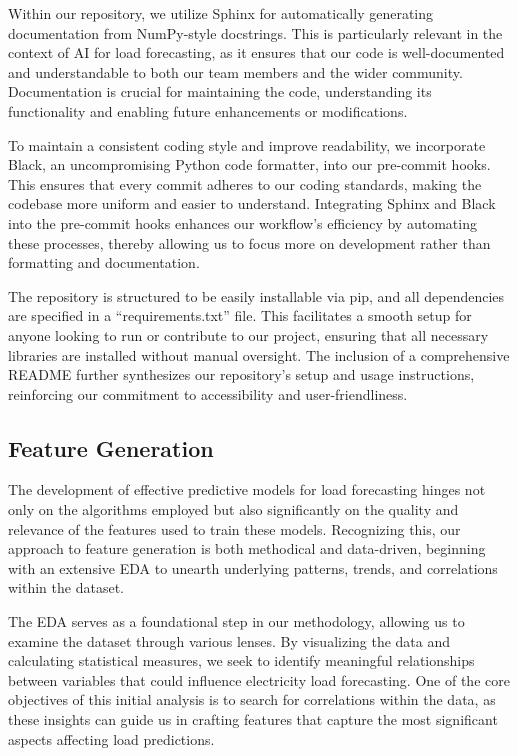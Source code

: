 \documentclass{article} %
\begin{document}
Within our repository, we utilize Sphinx for automatically generating documentation from NumPy-style docstrings. This is particularly relevant in the context of AI for load forecasting, as it ensures that our code is well-documented and understandable to both our team members and the wider community. Documentation is crucial for maintaining the code, understanding its functionality and enabling future enhancements or modifications. 

To maintain a consistent coding style and improve readability, we incorporate Black, an uncompromising Python code formatter, into our pre-commit hooks. This ensures that every commit adheres to our coding standards, making the codebase more uniform and easier to understand. Integrating Sphinx and Black into the pre-commit hooks enhances our workflow's efficiency by automating these processes, thereby allowing us to focus more on development rather than formatting and documentation. 

The repository is structured to be easily installable via pip, and all dependencies are specified in a “requirements.txt” file. This facilitates a smooth setup for anyone looking to run or contribute to our project, ensuring that all necessary libraries are installed without manual oversight. The inclusion of a comprehensive README further synthesizes our repository's setup and usage instructions, reinforcing our commitment to accessibility and user-friendliness. 



\subsection{Feature Generation}
\label{subCha.:FeatureGeneration}
The development of effective predictive models for load forecasting hinges not only on the algorithms employed but also significantly on the quality and relevance of the features used to train these models. Recognizing this, our approach to feature generation is both methodical and data-driven, beginning with an extensive \gls{EDA} to unearth underlying patterns, trends, and correlations within the dataset. 

The \gls{EDA} serves as a foundational step in our methodology, allowing us to examine the dataset through various lenses. By visualizing the data and calculating statistical measures, we seek to identify meaningful relationships between variables that could influence electricity load forecasting. One of the core objectives of this initial analysis is to search for correlations within the data, as these insights can guide us in crafting features that capture the most significant aspects affecting load predictions. 
\end{document}
